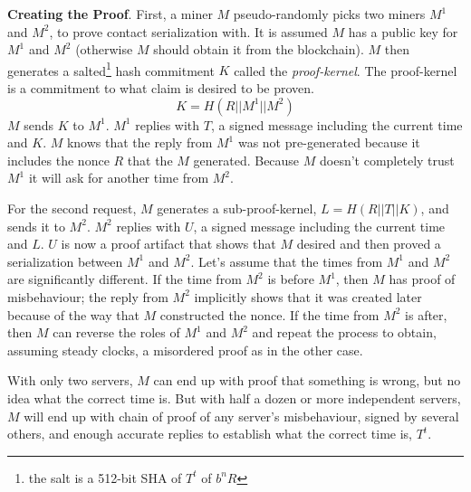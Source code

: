 \documentclass[letterpaper,11pt]{article}
\begin{document}
\textbf{Creating the Proof}. First, a miner $\mathit{M}$ pseudo-randomly picks two miners $\mathit{M^1}$ and $\mathit{M^2}$, to prove contact serialization with. It is assumed $\mathit{M}$ has a public key for $\mathit{M^1}$ and $\mathit{M^2}$ (otherwise $\mathit{M}$ should obtain it from the blockchain). $\mathit{M}$ then generates a salted\footnote{the salt is a 512-bit SHA of $\mathit{T^t}$ of $\mathit{b^n}$$R$} hash commitment $\mathit{K}$ called the \textit{proof-kernel}. The proof-kernel is a commitment to what claim is desired to be proven. $$\mathit{K} = \mathit{H}(R || \mathit{M^1} || \mathit{M^2})$$ $\mathit{M}$ sends $\mathit{K}$ to $\mathit{M^1}$. $\mathit{M^1}$ replies with $\mathit{T}$, a signed message including the current time and $\mathit{K}$. $\mathit{M}$ knows that the reply from $\mathit{M^1}$ was not pre-generated because it includes the nonce $R$ that the $\mathit{M}$ generated. Because $\mathit{M}$ doesn't completely trust $\mathit{M^1}$ it will ask for another time from $\mathit{M^2}$.\newline

For the second request, $\mathit{M}$ generates a sub-proof-kernel, $\mathit{L} = \mathit{H}(R || \mathit{T} || \mathit{K})$, and sends it to $\mathit{M^2}$. $\mathit{M^2}$ replies with $\mathit{U}$, a signed message including the current time and $\mathit{L}$. $\mathit{U}$ is now a proof artifact that shows that $\mathit{M}$ desired and then proved a serialization between $\mathit{M^1}$ and $\mathit{M^2}$. Let's assume that the times from $\mathit{M^1}$ and $\mathit{M^2}$ are significantly different. If the time from $\mathit{M^2}$ is before $\mathit{M^1}$, then $\mathit{M}$ has proof of misbehaviour; the reply from $\mathit{M^2}$ implicitly shows that it was created later because of the way that $\mathit{M}$ constructed the nonce. If the time from $\mathit{M^2}$ is after, then $\mathit{M}$ can reverse the roles of $\mathit{M^1}$ and $\mathit{M^2}$ and repeat the process to obtain, assuming steady clocks, a misordered proof as in the other case.\newline

With only two servers, $\mathit{M}$ can end up with proof that something is wrong, but no idea what the correct time is. But with half a dozen or more independent servers, $\mathit{M}$ will end up with chain of proof of any server's misbehaviour, signed by several others, and enough accurate replies to establish what the correct time is, $\mathit{T^t}$.\newline
\end{document}
